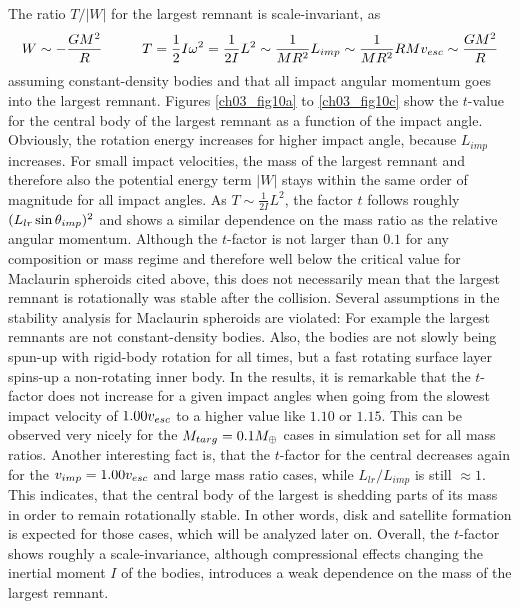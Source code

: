 The ratio $T / |W|$ for the largest remnant is scale-invariant, as
\begin{align}
W \sim - \frac{G M^2}{R} \hspace{1.0cm} T = \frac{1}{2} I \omega^2 = \frac{1}{2 I} L^2 \sim \frac{1}{M R^2} L_{imp} \sim \frac{1}{M R^2} R M v_{esc} \sim \frac{G M^2}{R}
\end{align}
assuming constant-density bodies and that all impact angular momentum goes into the largest remnant. Figures \ref{ch03_fig10a} to \ref{ch03_fig10c} show the $t$-value for the central body of the largest remnant as a function of the impact angle. Obviously, the rotation energy increases for higher impact angle, because $L_{imp}$ increases. For small impact velocities, the mass of the largest remnant and therefore also the potential energy term $|W|$ stays within the same order of magnitude for all impact angles. As $T \sim \frac{1}{2I} L^2$, the factor $t$ follows roughly $(L_{lr} \sin{\theta_{imp}} )^2$ and shows a similar dependence on the mass ratio as the relative angular momentum. Although the $t$-factor is not larger than $0.1$ for any composition or mass regime and therefore well below the critical value for Maclaurin spheroids cited above, this does not necessarily mean that the largest remnant is rotationally was stable after the collision. Several assumptions in the stability analysis for Maclaurin spheroids are violated: For example the largest remnants are not constant-density bodies. Also, the bodies are not slowly being spun-up with rigid-body rotation for all times, but a fast rotating surface layer spins-up a non-rotating inner body. 
In the results, it is remarkable that the $t$-factor does not increase for a given impact angles when going from the slowest impact velocity of $1.00 v_{esc}$ to a higher value like $1.10$ or $1.15$. This can be observed very nicely for the $M_{targ} = 0.1 M_{\oplus}$ cases in simulation set \css for all mass ratios. Another interesting fact is, that the $t$-factor for the central decreases again for the $v_{imp} = 1.00 v_{esc}$ and large mass ratio cases, while $L_{lr} / L_{imp}$ is still $\approx 1$. This indicates, that the central body of the largest is shedding parts of its mass in order to remain rotationally stable. In other words, disk and satellite formation is expected for those cases, which will be analyzed later on. 
Overall, the $t$-factor shows roughly a scale-invariance, although compressional effects changing the inertial moment $I$ of the bodies, introduces a weak dependence on the mass of the largest remnant.

